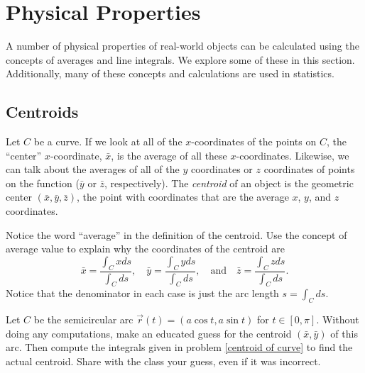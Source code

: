 \section{Physical Properties}

A number of physical properties of real-world objects can be calculated using the concepts of averages and line integrals.  We explore some of these in this section.  Additionally, many of these concepts and calculations are used in statistics.

\subsection{Centroids}%

\begin{definition}[Centroid]
  Let $C$ be a curve. If we look at all of the $x$-coordinates of the points on $C$, the ``center'' $x$-coordinate, $\bar x$, is the average of all these $x$-coordinates.  Likewise, we can talk about the averages of all of the $y$ coordinates or $z$ coordinates of points on the function ($\bar y$ or $\bar z$, respectively).  The \emph{centroid} of an object is the geometric center $(\bar x, \bar y, \bar z)$, the point with coordinates that are the average $x$, $y$, and $z$ coordinates.
\end{definition}

\begin{problem}[Centroid]\label{centroid of curve}%
  Notice the word ``average'' in the definition of the centroid. Use the concept of average value to explain why the coordinates of the centroid are %
$$
\bar x = \frac{\int_C x ds}{\int_C  ds},\quad
\bar y = \frac{\int_C y ds}{\int_C  ds},\quad 
\text{and}\quad
\bar z = \frac{\int_C z ds}{\int_C  ds}.
$$
Notice that the denominator in each case is just the arc length $s=\int_C ds$. 
\end{problem}


\begin{problem}\label{semicircle centroid}
 Let $C$ be the semicircular arc $\vec r(t)=(a\cos t, a\sin t)$ for $t\in[0,\pi]$. Without doing any computations, make an educated guess for the centroid $(\bar x, \bar y)$ of this arc.  Then compute the integrals given in problem \ref{centroid of curve} to find the actual centroid. Share with the class your guess, even if it was incorrect. 
\end{problem}

